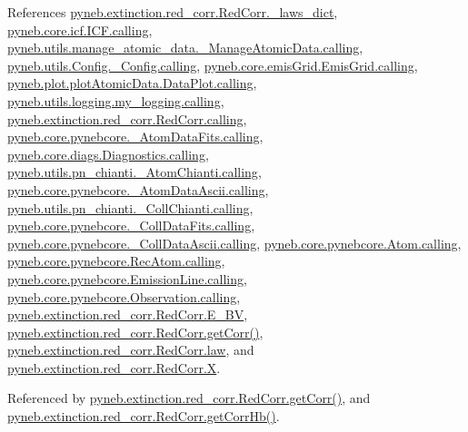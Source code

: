 \begin{DoxyVerb}
References \hyperlink{red__corr_8py_source_l00060}{pyneb.\+extinction.\+red\+\_\+corr.\+Red\+Corr.\+\_\+laws\+\_\+dict}, \hyperlink{icf_8py_source_l00016}{pyneb.\+core.\+icf.\+I\+C\+F.\+calling}, \hyperlink{manage__atomic__data_8py_source_l00018}{pyneb.\+utils.\+manage\+\_\+atomic\+\_\+data.\+\_\+\+Manage\+Atomic\+Data.\+calling}, \hyperlink{_config_8py_source_l00032}{pyneb.\+utils.\+Config.\+\_\+\+Config.\+calling}, \hyperlink{emis_grid_8py_source_l00041}{pyneb.\+core.\+emis\+Grid.\+Emis\+Grid.\+calling}, \hyperlink{plot_atomic_data_8py_source_l00042}{pyneb.\+plot.\+plot\+Atomic\+Data.\+Data\+Plot.\+calling}, \hyperlink{logging_8py_source_l00044}{pyneb.\+utils.\+logging.\+my\+\_\+logging.\+calling}, \hyperlink{red__corr_8py_source_l00059}{pyneb.\+extinction.\+red\+\_\+corr.\+Red\+Corr.\+calling}, \hyperlink{pynebcore_8py_source_l00090}{pyneb.\+core.\+pynebcore.\+\_\+\+Atom\+Data\+Fits.\+calling}, \hyperlink{diags_8py_source_l00169}{pyneb.\+core.\+diags.\+Diagnostics.\+calling}, \hyperlink{pn__chianti_8py_source_l00223}{pyneb.\+utils.\+pn\+\_\+chianti.\+\_\+\+Atom\+Chianti.\+calling}, \hyperlink{pynebcore_8py_source_l00311}{pyneb.\+core.\+pynebcore.\+\_\+\+Atom\+Data\+Ascii.\+calling}, \hyperlink{pn__chianti_8py_source_l00414}{pyneb.\+utils.\+pn\+\_\+chianti.\+\_\+\+Coll\+Chianti.\+calling}, \hyperlink{pynebcore_8py_source_l00568}{pyneb.\+core.\+pynebcore.\+\_\+\+Coll\+Data\+Fits.\+calling}, \hyperlink{pynebcore_8py_source_l00918}{pyneb.\+core.\+pynebcore.\+\_\+\+Coll\+Data\+Ascii.\+calling}, \hyperlink{pynebcore_8py_source_l01175}{pyneb.\+core.\+pynebcore.\+Atom.\+calling}, \hyperlink{pynebcore_8py_source_l02572}{pyneb.\+core.\+pynebcore.\+Rec\+Atom.\+calling}, \hyperlink{pynebcore_8py_source_l03263}{pyneb.\+core.\+pynebcore.\+Emission\+Line.\+calling}, \hyperlink{pynebcore_8py_source_l03419}{pyneb.\+core.\+pynebcore.\+Observation.\+calling}, \hyperlink{red__corr_8py_source_l00203}{pyneb.\+extinction.\+red\+\_\+corr.\+Red\+Corr.\+E\+\_\+\+B\+V}, \hyperlink{red__corr_8py_source_l00211}{pyneb.\+extinction.\+red\+\_\+corr.\+Red\+Corr.\+get\+Corr()}, \hyperlink{red__corr_8py_source_l00205}{pyneb.\+extinction.\+red\+\_\+corr.\+Red\+Corr.\+law}, and \hyperlink{red__corr_8py_source_l00180}{pyneb.\+extinction.\+red\+\_\+corr.\+Red\+Corr.\+X}.



Referenced by \hyperlink{red__corr_8py_source_l00211}{pyneb.\+extinction.\+red\+\_\+corr.\+Red\+Corr.\+get\+Corr()}, and \hyperlink{red__corr_8py_source_l00240}{pyneb.\+extinction.\+red\+\_\+corr.\+Red\+Corr.\+get\+Corr\+Hb()}.



\end{DoxyVerb}

